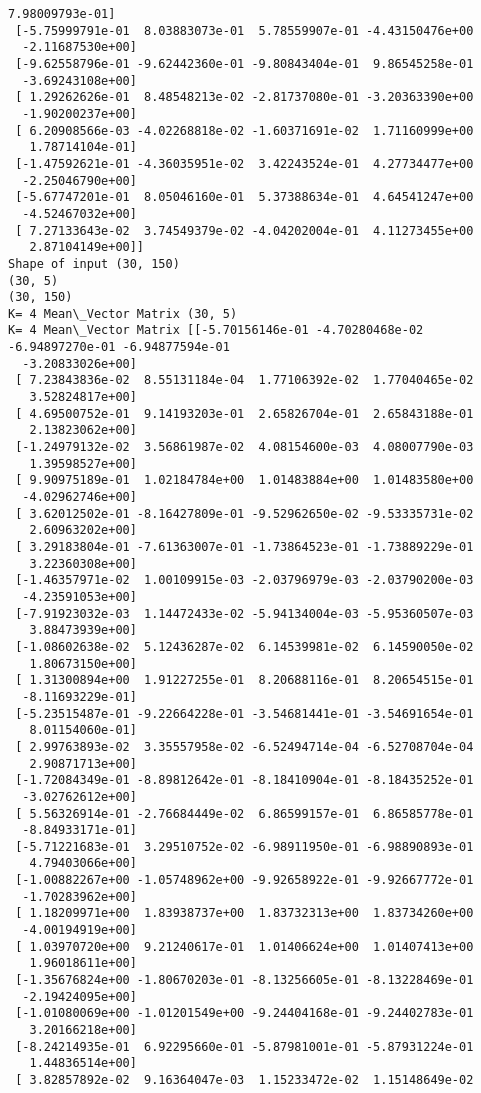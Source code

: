 \documentclass[11pt]{article}
\begin{document}
\begin{Verbatim}[commandchars=\\\{\}]
   7.98009793e-01]
 [-5.75999791e-01  8.03883073e-01  5.78559907e-01 -4.43150476e+00
  -2.11687530e+00]
 [-9.62558796e-01 -9.62442360e-01 -9.80843404e-01  9.86545258e-01
  -3.69243108e+00]
 [ 1.29262626e-01  8.48548213e-02 -2.81737080e-01 -3.20363390e+00
  -1.90200237e+00]
 [ 6.20908566e-03 -4.02268818e-02 -1.60371691e-02  1.71160999e+00
   1.78714104e-01]
 [-1.47592621e-01 -4.36035951e-02  3.42243524e-01  4.27734477e+00
  -2.25046790e+00]
 [-5.67747201e-01  8.05046160e-01  5.37388634e-01  4.64541247e+00
  -4.52467032e+00]
 [ 7.27133643e-02  3.74549379e-02 -4.04202004e-01  4.11273455e+00
   2.87104149e+00]]
Shape of input (30, 150)
(30, 5)
(30, 150)
K= 4 Mean\_Vector Matrix (30, 5)
K= 4 Mean\_Vector Matrix [[-5.70156146e-01 -4.70280468e-02 -6.94897270e-01 -6.94877594e-01
  -3.20833026e+00]
 [ 7.23843836e-02  8.55131184e-04  1.77106392e-02  1.77040465e-02
   3.52824817e+00]
 [ 4.69500752e-01  9.14193203e-01  2.65826704e-01  2.65843188e-01
   2.13823062e+00]
 [-1.24979132e-02  3.56861987e-02  4.08154600e-03  4.08007790e-03
   1.39598527e+00]
 [ 9.90975189e-01  1.02184784e+00  1.01483884e+00  1.01483580e+00
  -4.02962746e+00]
 [ 3.62012502e-01 -8.16427809e-01 -9.52962650e-02 -9.53335731e-02
   2.60963202e+00]
 [ 3.29183804e-01 -7.61363007e-01 -1.73864523e-01 -1.73889229e-01
   3.22360308e+00]
 [-1.46357971e-02  1.00109915e-03 -2.03796979e-03 -2.03790200e-03
  -4.23591053e+00]
 [-7.91923032e-03  1.14472433e-02 -5.94134004e-03 -5.95360507e-03
   3.88473939e+00]
 [-1.08602638e-02  5.12436287e-02  6.14539981e-02  6.14590050e-02
   1.80673150e+00]
 [ 1.31300894e+00  1.91227255e-01  8.20688116e-01  8.20654515e-01
  -8.11693229e-01]
 [-5.23515487e-01 -9.22664228e-01 -3.54681441e-01 -3.54691654e-01
   8.01154060e-01]
 [ 2.99763893e-02  3.35557958e-02 -6.52494714e-04 -6.52708704e-04
   2.90871713e+00]
 [-1.72084349e-01 -8.89812642e-01 -8.18410904e-01 -8.18435252e-01
  -3.02762612e+00]
 [ 5.56326914e-01 -2.76684449e-02  6.86599157e-01  6.86585778e-01
  -8.84933171e-01]
 [-5.71221683e-01  3.29510752e-02 -6.98911950e-01 -6.98890893e-01
   4.79403066e+00]
 [-1.00882267e+00 -1.05748962e+00 -9.92658922e-01 -9.92667772e-01
  -1.70283962e+00]
 [ 1.18209971e+00  1.83938737e+00  1.83732313e+00  1.83734260e+00
  -4.00194919e+00]
 [ 1.03970720e+00  9.21240617e-01  1.01406624e+00  1.01407413e+00
   1.96018611e+00]
 [-1.35676824e+00 -1.80670203e-01 -8.13256605e-01 -8.13228469e-01
  -2.19424095e+00]
 [-1.01080069e+00 -1.01201549e+00 -9.24404168e-01 -9.24402783e-01
   3.20166218e+00]
 [-8.24214935e-01  6.92295660e-01 -5.87981001e-01 -5.87931224e-01
   1.44836514e+00]
 [ 3.82857892e-02  9.16364047e-03  1.15233472e-02  1.15148649e-02

\end{Verbatim}
\end{document}
